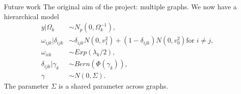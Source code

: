 \documentclass{beamer}
\begin{document}
\begin{frame}{Future work}
	The original aim of the project: multiple graphs.
	We now have a hierarchical model
	\begin{align*}
		y | \Omega_k                & \sim N_p(0, \Omega_k^{-1}),                                                          \\
		\omega_{ijk} | \delta_{ijk} & \sim \delta_{ijk} N(0, v_1^2) + (1 - \delta_{ijk}) N(0, v_0^2) \text{for } i \neq j, \\
		\omega_{iik}                & \sim Exp(\lambda_k/2),                                                               \\
		\delta_{ijk} | \gamma_{k}   & \sim Bern(\Phi(\gamma_{k})),                                                         \\
		\gamma                      & \sim N(0, \Sigma).
	\end{align*}
	The parameter $\Sigma$ is a shared parameter across graphs.
\end{frame}
\end{document}
